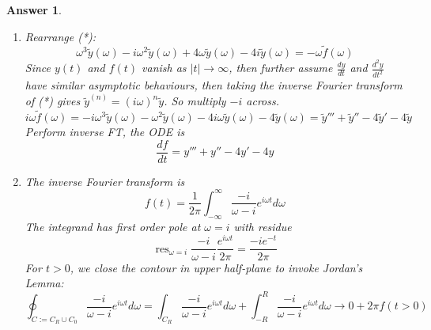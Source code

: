 \documentclass[a4paper]{article}
\DeclareMathOperator{\res}{res}
\newtheorem{ans}{Answer}[section]
\theoremstyle{new}
\begin{document}
\begin{ans}\leavevmode
\begin{enumerate}[label=(\alph*)]
\item Rearrange (*):
$$\omega^3\tilde{y}(\omega)-i\omega^2\tilde{y}(\omega)+4\omega \tilde{y}(\omega)-4i\tilde{y}(\omega)=-\omega\tilde{f}(\omega)$$
Since $y(t)$ and $f(t)$ vanish as $|t|\rightarrow\infty$, then further assume $\frac{dy}{dt}$ and $\frac{d^2y}{dt^2}$ have similar asymptotic behaviours, then taking the inverse Fourier transform of (*) gives $\tilde{y}^{(n)}=(i\omega)^n\tilde{y}$. So multiply $-i$ across.
$$i\omega\tilde{f}(\omega)=-i\omega^3\tilde{y}(\omega)-\omega^2\tilde{y}(\omega)-4i\omega \tilde{y}(\omega)-4\tilde{y}(\omega)=\tilde{y}'''+\tilde{y}''-4\tilde{y}'-4\tilde{y}$$
Perform inverse FT, the ODE is
$$\frac{df}{dt}=y'''+y''-4y'-4y$$
\item The inverse Fourier transform is
$$f(t)=\frac{1}{2\pi}\int_{-\infty}^\infty\frac{-i}{\omega-i}e^{i\omega t}d\omega$$
The integrand has first order pole at $\omega=i$ with residue
$$\res_{\omega=i}\frac{-i}{\omega-i}\frac{e^{i\omega t}}{2\pi}=\frac{-ie^{-t}}{2\pi}$$
For $t>0$, we close the contour in upper half-plane to invoke Jordan's Lemma:
$$\oint_{C:=C_R\cup C_0}\frac{-i}{\omega-i}e^{i\omega t}d\omega=\int_{C_R}\frac{-i}{\omega-i}e^{i\omega t}d\omega+\int_{-R}^R\frac{-i}{\omega-i}e^{i\omega t}d\omega\rightarrow 0+2\pi f(t>0)$$
\begin{center}
\end{center}
\end{enumerate}
\end{ans}
\end{document}

